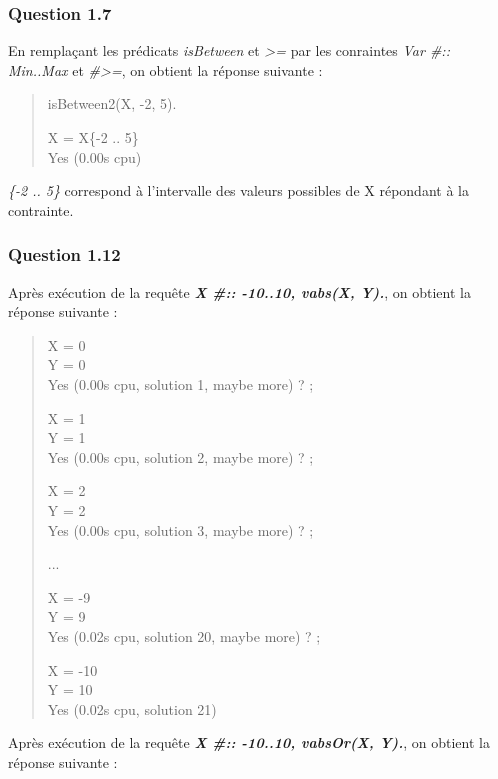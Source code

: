 \documentclass[
]{article}
\begin{document}
\hypertarget{header-n26}{%
\subsubsection{Question 1.7}\label{header-n26}}

En remplaçant les prédicats \emph{isBetween} et \emph{\textgreater=} par
les conraintes \emph{Var \#:: Min..Max} et \emph{\#\textgreater=}, on
obtient la réponse suivante :

\begin{quote}
isBetween2(X, -2, 5).

X = X\{-2 .. 5\}\\
Yes (0.00s cpu)
\end{quote}

\emph{\{-2 .. 5\}} correspond à l'intervalle des valeurs possibles de X
répondant à la contrainte.

\hypertarget{header-n32}{%
\subsubsection{Question 1.12}\label{header-n32}}

Après exécution de la requête \textbf{\emph{X \#:: -10..10, vabs(X,
Y).}}, on obtient la réponse suivante :

\begin{quote}
X = 0\\
Y = 0\\
Yes (0.00s cpu, solution 1, maybe more) ? ;

X = 1\\
Y = 1\\
Yes (0.00s cpu, solution 2, maybe more) ? ;

X = 2\\
Y = 2\\
Yes (0.00s cpu, solution 3, maybe more) ? ;

...

X = -9\\
Y = 9\\
Yes (0.02s cpu, solution 20, maybe more) ? ;

X = -10\\
Y = 10\\
Yes (0.02s cpu, solution 21)
\end{quote}

Après exécution de la requête \textbf{\emph{X \#:: -10..10, vabsOr(X,
Y).}}, on obtient la réponse suivante :
\end{document}
